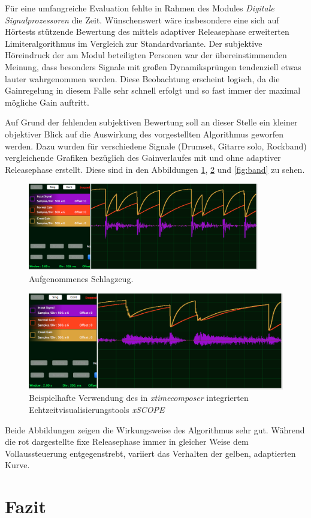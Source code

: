 \documentclass[paper=a4, fontsize=12pt]{scrartcl}
\numberwithin{equation}{section}		%
\numberwithin{figure}{section}			%
\numberwithin{table}{section}				%
\begin{document}
Für eine umfangreiche Evaluation fehlte in Rahmen des Modules \textit{Digitale Signalprozessoren} die Zeit. Wünschenswert wäre insbesondere eine sich auf Hörtests stützende Bewertung des mittels adaptiver Releasephase erweiterten Limiteralgorithmus im Vergleich zur Standardvariante. Der subjektive Höreindruck der am Modul beteiligten Personen war der übereinstimmenden Meinung, dass besonders Signale mit großen Dynamiksprüngen tendenziell etwas lauter wahrgenommen werden. Diese Beobachtung erscheint logisch, da die Gainregelung in diesem Falle sehr schnell erfolgt und so fast immer der maximal mögliche Gain auftritt.

Auf Grund der fehlenden subjektiven Bewertung soll an dieser Stelle ein kleiner objektiver Blick auf die Auswirkung des vorgestellten Algorithmus geworfen werden. Dazu wurden für verschiedene Signale (Drumset, Gitarre solo, Rockband) vergleichende Grafiken bezüglich des Gainverlaufes mit und ohne adaptiver Releasephase erstellt. Diese sind in den Abbildungen \ref{fig:drums}, \ref{fig:guitar} und \ref{fig:band} zu sehen.

\begin{figure}[h!]
  \centering
  \label{fig:drums}
  \includegraphics[width=0.9\textwidth]{graphics/drums_gains}
  \caption{Aufgenommenes Schlagzeug.}
\end{figure}

\begin{figure}[h!]
  \centering
  \label{fig:guitar}
  \includegraphics[width=.9\textwidth]{graphics/guitar_gains}
  \caption{Beispielhafte Verwendung des in \textit{xtimecomposer} integrierten Echtzeitvisualisierungstools \textit{xSCOPE}}
\end{figure}

Beide Abbildungen zeigen die Wirkungsweise des Algorithmus sehr gut. Während die rot dargestellte fixe Releasephase immer in gleicher Weise dem Vollaussteuerung entgegenstrebt, variiert das Verhalten der gelben, adaptierten Kurve. 

 

\section{Fazit}





\printbibliography
\end{document}
